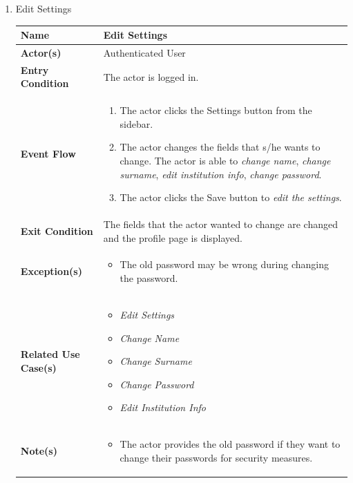 \begin{enumerate}
\item Edit Settings
\begin{center}
    \begin{tabular}{ | m{10em} | m{10cm}| } 
      \hline
      \textbf{Name} & Edit Settings  \\ 
      \hline
      \textbf{Actor(s)} & Authenticated User \\ 
      \hline
      \textbf{Entry Condition} & The actor is logged in. \\ 
      \hline
      \textbf{Event Flow} & 
          \begin{enumerate}[(1)]
              \item The actor clicks the Settings button from the sidebar.
              \item The actor changes the fields that s/he wants to change. The actor is able to \textit{change name}, \textit{change surname}, \textit{edit institution info}, \textit{change password}.
              \item The actor clicks the Save button to \textit{edit the settings}.
          \end{enumerate}
      \\ 
      \hline
      \textbf{Exit Condition} & The fields that the actor wanted to change are changed and the profile page is displayed.  \\ 
      \hline
      \textbf{Exception(s)} & 
      \begin{itemize}
          \item The old password may be wrong during changing the password.
      \end{itemize}
          \\ 
      \hline
      \textbf{Related Use Case(s)} & 
      \begin{itemize}
          \item \textit{Edit Settings}
          \item \textit{Change Name}
          \item \textit{Change Surname}
          \item \textit{Change Password}
          \item \textit{Edit Institution Info}
      \end{itemize}
          \\ 
      \hline
      \textbf{Note(s)} & 
      \begin{itemize}
          \item The actor provides the old password if they want to change their passwords for security measures.
      \end{itemize}
          \\ 
      \hline
    \end{tabular}
\end{center}


\end{enumerate}
